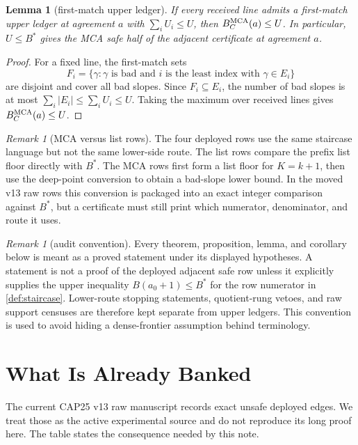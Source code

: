 \documentclass[a4paper,11pt]{amsart}
\newtheorem{lemma}[theorem]{Lemma}
\theoremstyle{remark}
\newtheorem{remark}[theorem]{Remark}
\begin{document}
\begin{lemma}[first-match upper ledger]\label{lem:first-match-ledger}
If every received line admits a first-match upper ledger at agreement \(a\) with \(\sum_iU_i\le U\), then \(B_C^{\rm MCA}(a)\le U\).  In particular, \(U\le B^*\) gives the MCA safe half of the adjacent certificate at agreement \(a\).
\end{lemma}

\begin{proof}
For a fixed line, the first-match sets
\[
        F_i=\{\gamma:\gamma\text{ is bad and }i\text{ is the least index with }\gamma\in E_i\}
\]
are disjoint and cover all bad slopes.  Since \(F_i\subseteq E_i\), the number of bad slopes is at most \(\sum_i|E_i|\le\sum_iU_i\le U\).  Taking the maximum over received lines gives \(B_C^{\rm MCA}(a)\le U\).
\end{proof}

\begin{remark}[MCA versus list rows]\label{rem:mca-list-route}
The four deployed rows use the same staircase language but not the same lower-side route.  The list rows compare the prefix list floor directly with \(B^*\).  The MCA rows first form a list floor for \(K=k+1\), then use the deep-point conversion to obtain a bad-slope lower bound.  In the moved v13 raw rows this conversion is packaged into an exact integer comparison against \(B^*\), but a certificate must still print which numerator, denominator, and route it uses.
\end{remark}

\begin{remark}[audit convention]\label{rem:audit-convention}
Every theorem, proposition, lemma, and corollary below is meant as a proved statement under its displayed hypotheses.  A statement is not a proof of the deployed adjacent safe row unless it explicitly supplies the upper inequality \(B(a_0+1)\le B^*\) for the row numerator in \cref{def:staircase}.  Lower-route stopping statements, quotient-rung vetoes, and raw support censuses are therefore kept separate from upper ledgers.  This convention is used to avoid hiding a dense-frontier assumption behind terminology.
\end{remark}

\section{What Is Already Banked}

The current CAP25 v13 raw manuscript records exact unsafe deployed edges.  We treat those as the active experimental source and do not reproduce its long proof here.  The table states the consequence needed by this note.
\end{document}
